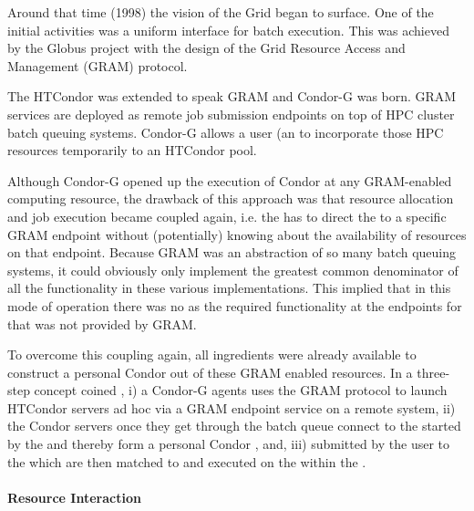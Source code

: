 \documentclass{sig-alternate}
\begin{document}
%
%
Around that time (1998) the vision of the Grid began to surface.
One of the initial activities was a uniform interface for batch execution.
This was achieved by the Globus project with the design of the Grid
Resource Access and Management (GRAM) protocol.

The HTCondor  was extended to speak GRAM and Condor-G
\cite{condor-g} was born.
GRAM services are deployed as remote job submission endpoints on top of HPC
cluster batch queuing systems.
Condor-G allows a user (an  to incorporate those HPC resources
temporarily to an HTCondor pool.

Although Condor-G opened up the execution of Condor  at any
GRAM-enabled computing resource, the drawback of this approach was that
resource allocation and job execution became coupled again, i.e. the
 has to direct the  to a specific GRAM endpoint
without (potentially) knowing about the availability of resources on that
endpoint.
Because GRAM was an abstraction of so many batch queuing systems, it could
obviously only implement the greatest common denominator of all the
functionality in these various implementations.
This implied that in this mode of operation there was no 
as the required functionality at the endpoints for that was not provided by
GRAM.

%
%
To overcome this coupling again, all ingredients were already available to
construct a personal Condor  out of these GRAM enabled resources.
In a three-step concept coined , i) a Condor-G agents uses
the GRAM protocol to launch HTCondor servers ad hoc via a GRAM endpoint service
on a remote system, ii) the Condor servers once they get through the batch
queue connect to the  started by the  and
thereby form a personal Condor , and, iii) 
submitted by the user to the  which are then matched to and
executed on the  within the .



\paragraph{Resource Interaction}
\end{document}
